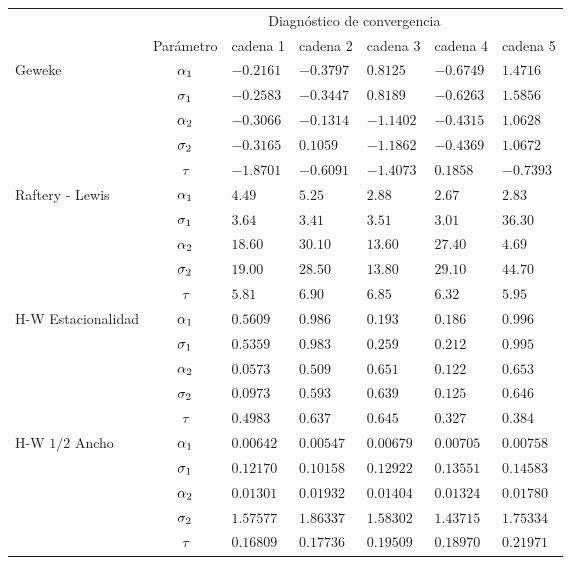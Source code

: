 \begin{table}[!h]
\centering
\begin{tabular}{|l|c|l|l|l|l|l|}
\hline
& \multicolumn{6}{|c|}{Diagnóstico de convergencia} \\
\cline{2-7}
& Parámetro & cadena 1  & cadena 2  & cadena 3 & cadena 4 & cadena 5	 \\
\hline \hline
\multirow{5}{2.5cm}{Geweke} & $\alpha_1$ & $-0.2161$ & $-0.3797$ & $0.8125 $ & $-0.6749$  & $ 1.4716$\\ \cline{2-7}
& $\sigma_1$& $-0.2583 $ & $-0.3447$ & $0.8189$ & $-0.6263$ & $ 1.5856$\\
\cline{2-7}
& $\alpha_2$& $-0.3066 $ & $-0.1314 $ & $-1.1402$ & $ -0.4315$ & $1.0628$\\
\cline{2-7}
& $\sigma_2$& $-0.3165 $ & $0.1059$ & $-1.1862$ & $ -0.4369$ & $1.0672$\\
\cline{2-7}
& $\tau $& $-1.8701 $ & $-0.6091$ & $-1.4073$ & $0.1858$ & $-0.7393$\\
  \cline{1-7}
  \multirow{5}{2.5cm}{Raftery - Lewis} & $\alpha_1$ & $4.49$ & $5.25  $ & $2.88 $ & $2.67$  & $ 2.83 $\\ \cline{2-7}
& $\sigma_1$& $3.64 $ & $3.41 $ & $3.51$ & $3.01$ & $36.30 $\\
\cline{2-7}
& $\alpha_2$ & $18.60  $ & $30.10 $ & $13.60$ & $27.40$ & $4.69$\\
\cline{2-7}
& $\sigma_2$& $19.00 $ & $28.50$ & $13.80$ & $29.10 $ & $44.70$\\
\cline{2-7}
& $\tau $& $5.81 $ & $6.90$ & $6.85$ & $6.32 $ & $5.95$\\
  \cline{1-7}
  \multirow{5}{2.5cm}{H-W Estacionalidad} & $\alpha_1$ & $0.5609$ & $0.986 $ & $ 0.193$ & $0.186$  & $0.996$\\ \cline{2-7}
& $\sigma_1$& $0.5359  $ & $0.983   $ & $0.259$ & $0.212$ & $0.995$\\
\cline{2-7}
& $\alpha_2$& $0.0573 $ & $0.509$ & $0.651$ & $0.122$ & $0.653$\\
\cline{2-7}
& $\sigma_2$& $0.0973 $ & $0.593 $ & $0.639$ & $0.125$ & $0.646$\\
\cline{2-7}
& $\tau$& $0.4983 $ & $0.637 $ & $0.645$ & $0.327$ & $0.384$\\
  \cline{1-7}
  \multirow{5}{2.5cm}{H-W $1/2$ Ancho} & $\alpha_1$ & $0.00642$ & $0.00547 $ & $0.00679$ & $0.00705$  & $ 0.00758$\\ \cline{2-7}
& $\sigma_1$& $0.12170 $ & $0.10158$ & $0.12922$ & $0.13551$ & $0.14583$\\
\cline{2-7}
& $\alpha_2$& $0.01301 $ & $0.01932$ & $0.01404$ & $0.01324$ & $0.01780$\\
\cline{2-7}
& $\sigma_2$& $1.57577$ & $1.86337$ & $1.58302$ & $ 1.43715$ & $1.75334$\\
\cline{2-7}
& $\tau$& $0.16809  $ & $0.17736$ & $0.19509 $ & $0.18970$ & $0.21971$\\
  \cline{1-7}


\end{tabular}
\end{table}
